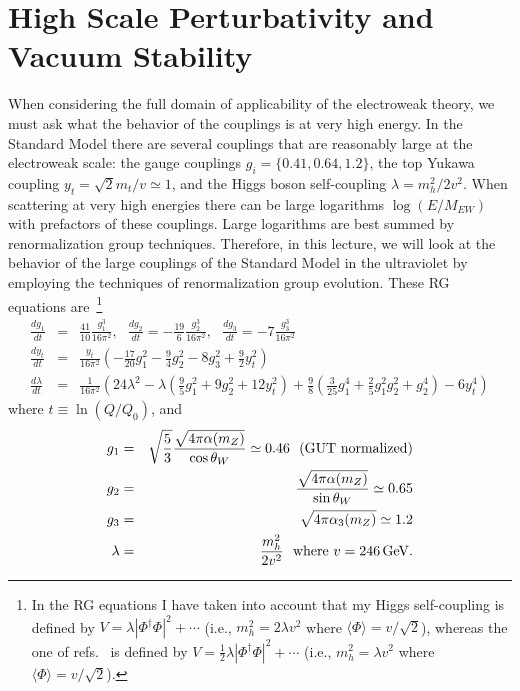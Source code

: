 \documentclass[12pt]{article}
\def\eeq{\end{eqnarray}}
\def\bea{\begin{eqnarray}}
\def\eea{\end{eqnarray}}
\def\xsection#1{\section{#1}}
\def\gev{\, {\rm GeV}}
\begin{document}
\xsection{High Scale Perturbativity and Vacuum Stability}

When considering the full domain of applicability of the electroweak theory, we must ask what the behavior of the couplings is at very high energy. In the Standard Model there are several couplings that are reasonably large at the electroweak scale: the gauge couplings $g_i=\{ 0.41,0.64,1.2\}$, the top Yukawa coupling $y_t=\sqrt{2}m_t/v\simeq 1$, and the Higgs boson self-coupling $\lambda =m^2_h/2v^2$.  When scattering at very high energies there can be large logarithms $\log(E/M_{EW})$ with prefactors of these couplings. Large logarithms are best summed by renormalization group techniques.  Therefore, in this lecture, we will look at the behavior of the large couplings of the Standard Model in the ultraviolet by employing the techniques of renormalization group evolution.  These RG equations are~\cite{Machacek:1984zw,Arason:1991ic}\footnote{In the RG equations I have taken into account that my Higgs self-coupling is defined by $V=\lambda|\Phi^\dagger \Phi|^2+\cdots$ (i.e., $m_h^2=2\lambda v^2$ where $\langle \Phi\rangle=v/\sqrt{2}$), whereas the one of refs.~\cite{Machacek:1984zw,Arason:1991ic} is defined by $V=\frac{1}{2}\lambda|\Phi^\dagger \Phi|^2+\cdots$ (i.e., $m_h^2=\lambda v^2$ where $\langle \Phi\rangle=v/\sqrt{2}$).}
\bea
\frac{dg_1}{dt}&=& \frac{41}{10} \frac{g_1^3}{16\pi^2},~~~
\frac{dg_2}{dt}= -\frac{19}{6} \frac{g_2^3}{16\pi^2},~~~
\frac{dg_3}{dt}= -7\frac{g_3^3}{16\pi^2} \label{eq:RGEs} \label{eq:sm rges} \\
\frac{dy_t}{dt}&=& \frac{y_t}{16\pi^2}\left(-\frac{17}{20} g_1^2- \frac{9}{4} g_2^2 - 8 g_3^2+\frac{9}{2}y_t^2\right)\nonumber \\
\frac{d\lambda}{dt}&=& \frac{1}{16\pi^2}\left( 24\lambda^2
-\lambda \left( \frac{9}{5}g_1^2+9g_2^2 +12y_t^2\right)
+\frac{9}{8}\left( \frac{3}{25}g_1^4+\frac{2}{5}g^2_1g^2_2+g_2^4\right) 
-6y_t^4\right) \nonumber
\eea
where $t\equiv \ln (Q/Q_0)$, and
\bea
g_1&=& \sqrt{\frac{5}{3}}\frac{\sqrt{4\pi\alpha(m_Z)}}{\cos\theta_W}\simeq 0.46~~{\rm (GUT~normalized)} \\
g_2 & = & \frac{\sqrt{4\pi\alpha(m_Z)}}{\sin\theta_W}\simeq 0.65 \\
g_3 & = &\sqrt{4\pi \alpha_3(m_Z)}\simeq 1.2 \\
\lambda & = &\frac{m_h^2}{2v^2}~~{\rm where}~v=246\gev .
\eeq
\end{document}

